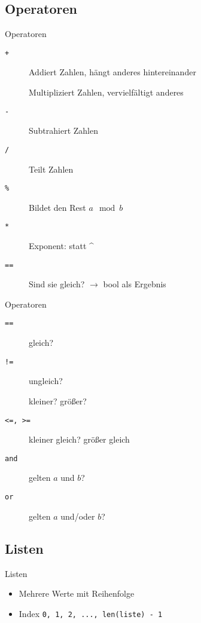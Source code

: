 \subsection{Operatoren}
\begin{frame}{Operatoren}
	\begin{description}
		\item[\tt+] Addiert Zahlen, hängt anderes hintereinander
		\item[\tt*] Multipliziert Zahlen, vervielfältigt anderes
		\item[\tt-] Subtrahiert Zahlen
		\item[\tt/] Teilt Zahlen
		\item[\tt\%] Bildet den Rest $a \mod b$
		\item[\tt**] Exponent: statt \^{}
		\item[\tt==] Sind sie gleich? $\to$ bool als Ergebnis
	\end{description}
	
\end{frame}
\begin{frame}{Operatoren}
	\begin{description}
		\item[\tt==] gleich?
		\item[\tt!=] ungleich?
		\item[\tt<, >] kleiner? größer?
		\item[\tt<=, >=] kleiner gleich? größer gleich
		\item[\tt and] gelten $a$ und $b$?
		\item[\tt or] gelten $a$ und/oder $b$?
	\end{description}
	
\end{frame}

\subsection{Listen}
\begin{frame}{Listen}
	\begin{itemize}
		\item Mehrere Werte mit Reihenfolge
		\item Index \texttt{0, 1, 2, ..., len(liste) - 1}
	\end{itemize}
	
\end{frame}

